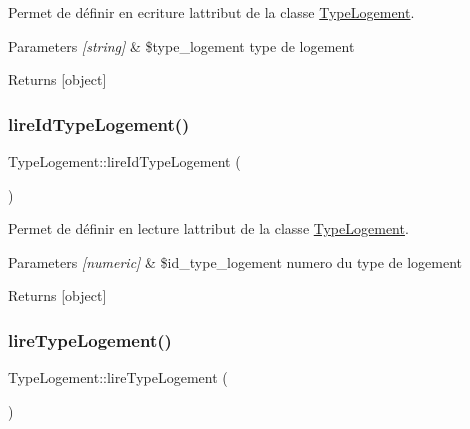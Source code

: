 Permet de définir en ecriture l\textquotesingle{}attribut de la classe \hyperlink{class_type_logement}{Type\+Logement}. 


\begin{DoxyParams}{Parameters}
{\em \mbox{[}string\mbox{]}} & \$type\+\_\+logement type de logement \\
\hline
\end{DoxyParams}
\begin{DoxyReturn}{Returns}
\mbox{[}object\mbox{]} 
\end{DoxyReturn}
\mbox{\label{class_type_logement_aeccc67026d51459dabd97d6267382d1a}} 
\subsubsection{\texorpdfstring{lire\+Id\+Type\+Logement()}{lireIdTypeLogement()}}
{\footnotesize\ttfamily Type\+Logement\+::lire\+Id\+Type\+Logement (\begin{DoxyParamCaption}{ }\end{DoxyParamCaption})}



Permet de définir en lecture l\textquotesingle{}attribut de la classe \hyperlink{class_type_logement}{Type\+Logement}. 


\begin{DoxyParams}{Parameters}
{\em \mbox{[}numeric\mbox{]}} & \$id\+\_\+type\+\_\+logement numero du type de logement \\
\hline
\end{DoxyParams}
\begin{DoxyReturn}{Returns}
\mbox{[}object\mbox{]} 
\end{DoxyReturn}
\mbox{\label{class_type_logement_ae03a0087b23deebdbcd5298e8c69082e}} 
\subsubsection{\texorpdfstring{lire\+Type\+Logement()}{lireTypeLogement()}}
{\footnotesize\ttfamily Type\+Logement\+::lire\+Type\+Logement (\begin{DoxyParamCaption}{ }\end{DoxyParamCaption})}



